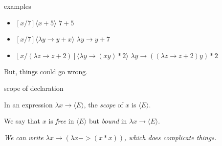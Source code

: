 \begin{frame}{examples}

\begin{itemize}
   \pause \item $[x/7]\langle x + 5 \rangle$  \hspace{20pt} \pause $7 + 5$
   \pause \item $[x/7]\langle \lambda y \rightarrow y + x \rangle$   \hspace{20pt} \pause $\lambda y \rightarrow y + 7$
   \pause \item $[x/(\lambda z \rightarrow z + 2)]\langle \lambda y \rightarrow (x y) * 2 \rangle$ 
\hspace{20pt} \pause  $\lambda y \rightarrow ((\lambda z \rightarrow z + 2) y) * 2$ 
 \end{itemize}

\pause\vspace{20pt}

But, things could go wrong.

\end{frame}

\begin{frame}{scope of declaration}

\pause

  In an expression $\lambda x \rightarrow  \langle E \rangle$, the {\em scope} of $x$
  is $\langle E \rangle$. 

\pause\vspace{10pt}

  We say that $x$ is {\em free} in $\langle E \rangle$ but {\em bound} in
  $\lambda x \rightarrow \langle E \rangle$.

\pause\vspace{60pt}

{\em We can write $\lambda x \rightarrow ( \lambda x -> (x*x))$, which does complicate things.}

\end{frame}


